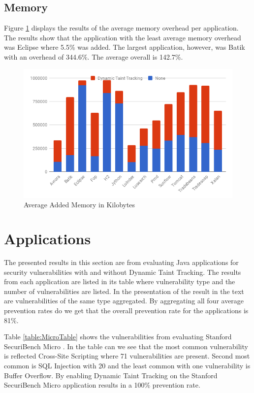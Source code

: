 \subsection{Memory}
Figure \ref{fig:Memory} displays the results of the average memory overhead per application. The results show that the application with the least average memory overhead was Eclipse where 5.5\% was added. The largest application, however, was Batik with an overhead of 344.6\%. The average overall is 142.7\%.

\begin{figure}[!hbt]
    \centering
    \includegraphics[width=\textwidth]{images/Memory.png}
    \caption{Average Added Memory in Kilobytes}
    \label{fig:Memory}
\end{figure}



\section{Applications}
\label{Applications}
The presented results in this section are from evaluating Java applications for security vulnerabilities with and without Dynamic Taint Tracking. The results from each application are listed in its table where vulnerability type and the number of vulnerabilities are listed. In the presentation of the result in the text are vulnerabilities of the same type aggregated. By aggregating all four average prevention rates do we get that the overall prevention rate for the applications is 81\%.

Table \ref{table:MicroTable} shows the vulnerabilities from evaluating Stanford SecuriBench Micro \parencite{securiBenchMicro}. In the table can we see that the most common vulnerability is reflected Cross-Site Scripting where 71 vulnerabilities are present. Second most common is SQL Injection with 20 and the least common with one vulnerability is Buffer Overflow. By enabling Dynamic Taint Tracking on the Stanford SecuriBench Micro \parencite{securiBenchMicro} application results in a 100\% prevention rate.

